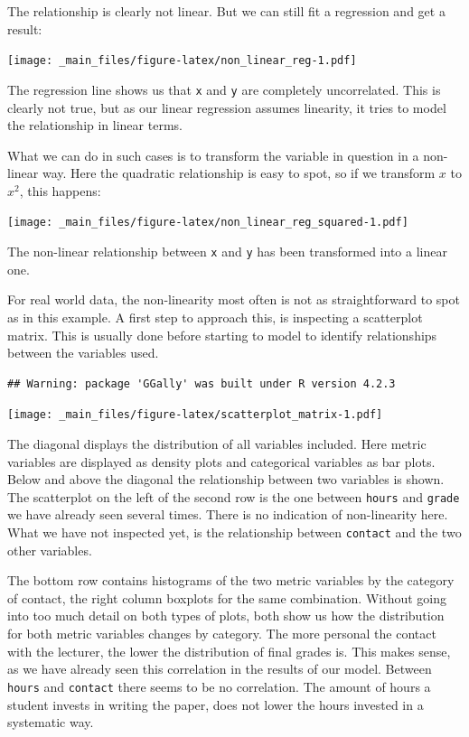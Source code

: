 \documentclass[
]{book}
\begin{document}
The relationship is clearly not linear. But we can still fit a regression and
get a result:

\texttt{[image: \_main\_files/figure-latex/non\_linear\_reg-1.pdf]}

The regression line shows us that \texttt{x} and \texttt{y} are completely uncorrelated. This
is clearly not true, but as our linear regression assumes linearity, it tries to
model the relationship in linear terms.

What we can do in such cases is to transform the variable in question in a
non-linear way. Here the quadratic relationship is easy to spot, so if we
transform \(x\) to \(x^2\), this happens:

\texttt{[image: \_main\_files/figure-latex/non\_linear\_reg\_squared-1.pdf]}

The non-linear relationship between \texttt{x} and \texttt{y} has been transformed into a
linear one.

For real world data, the non-linearity most often is not as straightforward to
spot as in this example. A first step to approach this, is inspecting a
scatterplot matrix. This is usually done before starting to model to identify
relationships between the variables used.

\begin{verbatim}
## Warning: package 'GGally' was built under R version 4.2.3
\end{verbatim}

\texttt{[image: \_main\_files/figure-latex/scatterplot\_matrix-1.pdf]}

The diagonal displays the distribution of all variables included. Here metric
variables are displayed as density plots and categorical variables as bar plots.
Below and above the diagonal the relationship between two variables is shown.
The scatterplot on the left of the second row is the one between \texttt{hours} and
\texttt{grade} we have already seen several times. There is no indication of
non-linearity here. What we have not inspected yet, is the relationship
between \texttt{contact} and the two other variables.

The bottom row contains histograms of the two metric variables by the category
of contact, the right column boxplots for the same combination. Without going
into too much detail on both types of plots, both show us how the distribution
for both metric variables changes by category. The more personal the contact
with the lecturer, the lower the distribution of final grades is. This makes
sense, as we have already seen this correlation in the results of our model.
Between \texttt{hours} and \texttt{contact} there seems to be no correlation. The amount of
hours a student invests in writing the paper, does not lower the hours invested
in a systematic way.
\end{document}
